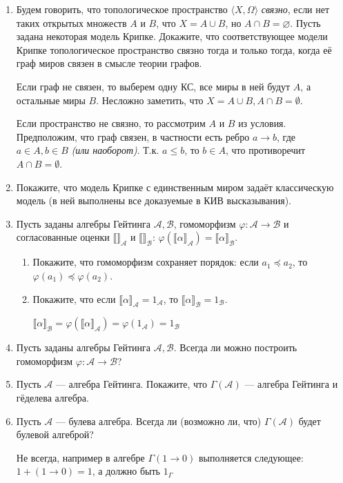 \begin{enumerate}[wide, labelwidth=!, labelindent=0pt]
    \item Будем говорить, что топологическое пространство $\langle X, \Omega\rangle$ \emph{связно}, если нет таких
          открытых множеств $A$ и $B$, что $X = A \cup B$, но $A \cap B = \varnothing$. Пусть задана некоторая модель Крипке.
          Докажите, что соответствующее модели Крипке топологическое пространство связно тогда и только тогда, когда её граф
          миров связен в смысле теории графов.

          Если граф не связен, то выберем одну КС, все миры в ней будут \(A\), а остальные миры \(B\). Несложно заметить, что \(X = A\cup B, A\cap B = \emptyset\).

          Если пространство не связно, то рассмотрим \(A\) и \(B\) из условия. Предположим, что граф связен, в частности есть ребро \(a \to b\), где \(a\in A, b\in B\) \textit{(или наоборот)}. Т.к. \(a \leq b\), то \(b\in A\), что противоречит \(A\cap B =\emptyset\).

    \item Покажите, что модель Крипке с единственным миром задаёт классическую модель (в ней выполнены
          все доказуемые в КИВ высказывания).

    \item Пусть заданы алгебры Гейтинга $\mathcal{A},\mathcal{B}$, гомоморфизм $\varphi: \mathcal{A} \rightarrow \mathcal{B}$
          и согласованные оценки $\llbracket\rrbracket_\mathcal{A}$ и $\llbracket\rrbracket_\mathcal{B}$:
          $\varphi(\llbracket\alpha\rrbracket_\mathcal{A}) = \llbracket\alpha\rrbracket_\mathcal{B}$.
          \begin{enumerate}
              \item Покажите, что гомоморфизм сохраняет порядок: если $a_1\preceq a_2$, то $\varphi(a_1) \preceq \varphi(a_2)$.
              \item Покажите, что если $\llbracket \alpha \rrbracket_\mathcal{A} = 1_\mathcal{A}$, то $\llbracket\alpha\rrbracket_\mathcal{B} = 1_\mathcal{B}$.

                    \(\llbracket \alpha \rrbracket_{\mathcal{B}} = \varphi(\llbracket \alpha \rrbracket_{\mathcal{A}}) = \varphi(1_{\mathcal{A}}) = 1_{\mathcal{B}}\)
          \end{enumerate}

    \item Пусть заданы алгебры Гейтинга $\mathcal{A},\mathcal{B}$. Всегда ли можно построить гомоморфизм $\varphi: \mathcal{A}\rightarrow\mathcal{B}$?

    \item Пусть $\mathcal{A}$ --- алгебра Гейтинга. Покажите, что $\Gamma(\mathcal{A})$ --- алгебра Гейтинга и гёделева алгебра.

    \item Пусть $\mathcal{A}$ --- булева алгебра. Всегда ли (возможно ли, что) $\Gamma(\mathcal{A})$ будет булевой алгеброй?

          Не всегда, например в алгебре \(\Gamma(1 \to 0)\) выполняется следующее: \(1 + (1 \to 0) = 1\), а должно быть \(1_\Gamma\)
\end{enumerate}


